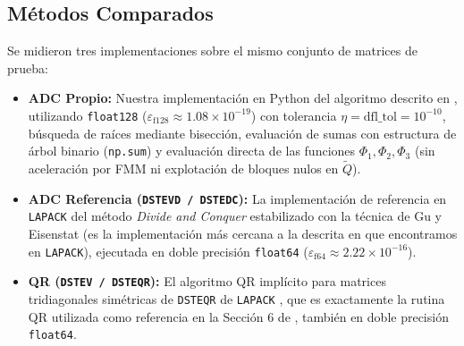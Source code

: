 \documentclass[11pt,a4paper]{article}
\begin{document}
\subsection{Métodos Comparados}
Se midieron tres implementaciones sobre el mismo conjunto de matrices de prueba:
\begin{itemize}
    \item \textbf{ADC Propio:} Nuestra implementación en Python del algoritmo descrito en \cite{gu1995}, utilizando \texttt{float128} ($\varepsilon_{\text{f128}} \approx 1.08 \times 10^{-19}$) con tolerancia $\eta = \text{dfl\_tol} = 10^{-10}$, búsqueda de raíces mediante bisección, evaluación de sumas con estructura de árbol binario (\texttt{np.sum}) y evaluación directa de las funciones $\Phi_1, \Phi_2, \Phi_3$ (sin aceleración por FMM ni explotación de bloques nulos en $\tilde{Q}$).
    \item \textbf{ADC Referencia (\texttt{DSTEVD / DSTEDC}):} La implementación de referencia en \texttt{LAPACK} del método \textit{Divide and Conquer} estabilizado con la técnica de Gu y Eisenstat \cite{gu1995} (es la implementación más cercana a la descrita en \cite{gu1995} que encontramos en \texttt{LAPACK}), ejecutada en doble precisión \texttt{float64} ($\varepsilon_{\text{f64}} \approx 2.22 \times 10^{-16}$).
    \item \textbf{QR (\texttt{DSTEV / DSTEQR}):} El algoritmo QR implícito para matrices tridiagonales simétricas de \texttt{DSTEQR} de \texttt{LAPACK} \cite{lapack}, que es exactamente la rutina QR utilizada como referencia en la Sección 6 de \cite{gu1995}, también en doble precisión \texttt{float64}.
\end{itemize}
\end{document}
